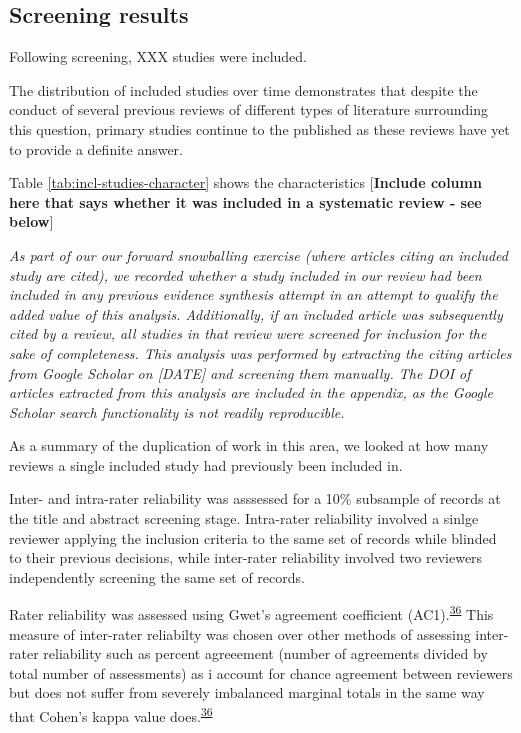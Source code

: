 \documentclass[a4paper, twoside]{templates/ociamthesis}
\begin{document}
\hypertarget{screening-results}{%
\subsection{Screening results}\label{screening-results}}

Following screening, XXX studies were included.

The distribution of included studies over time demonstrates that despite the conduct of several previous reviews of different types of literature surrounding this question, primary studies continue to the published as these reviews have yet to provide a definite answer.

Table \ref{tab:incl-studies-character} shows the characteristics {[}\textbf{Include column here that says whether it was included in a systematic review - see below}{]}

\emph{As part of our our forward snowballing exercise (where articles citing an included study are cited), we recorded whether a study included in our review had been included in any previous evidence synthesis attempt in an attempt to qualify the added value of this analysis. Additionally, if an included article was subsequently cited by a review, all studies in that review were screened for inclusion for the sake of completeness. This analysis was performed by extracting the citing articles from Google Scholar on {[}DATE{]} and screening them manually. The DOI of articles extracted from this analysis are included in the appendix, as the Google Scholar search functionality is not readily reproducible.}

As a summary of the duplication of work in this area, we looked at how many reviews a single included study had previously been included in.

Inter- and intra-rater reliability was asssessed for a 10\% subsample of records at the title and abstract screening stage. Intra-rater reliability involved a sinlge reviewer applying the inclusion criteria to the same set of records while blinded to their previous decisions, while inter-rater reliability involved two reviewers independently screening the same set of records.

Rater reliability was assessed using Gwet's agreement coefficient (AC1).\textsuperscript{\protect\hyperlink{ref-gwet2008}{36}} This measure of inter-rater reliabilty was chosen over other methods of assessing inter-rater reliability such as percent agreeement (number of agreements divided by total number of assessments) as i account for chance agreement between reviewers but does not suffer from severely imbalanced marginal totals in the same way that Cohen's kappa value does.\textsuperscript{\protect\hyperlink{ref-gwet2008}{36}}
\end{document}
